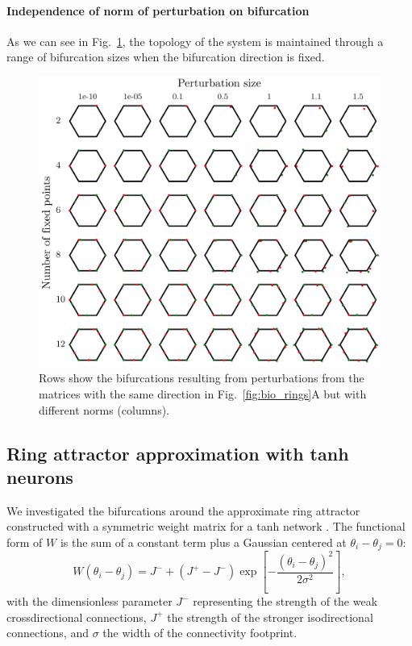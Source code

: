 \documentclass{article} %
\newcounter{ct}
\theoremstyle{definition}
\theoremstyle{remark}
\begin{document}
\paragraph{Independence of norm of perturbation on bifurcation}
As we can see in Fig.~\ref{fig:noorman_ring_allfxdpnts_allnorm}, the topology of the system is maintained through a range of bifurcation sizes when the bifurcation direction is fixed.
\begin{figure}[tbhp]
     \centering
    \includegraphics[width=\textwidth]{noorman_ring_N6_pert_allfxdpnts_allnorms}
       \caption{Rows show the bifurcations resulting from perturbations from the matrices with the same direction in Fig.~\ref{fig:bio_rings}A but with different norms (columns). }\label{fig:noorman_ring_allfxdpnts_allnorm}
\end{figure}






\newpage
\subsection{Ring attractor approximation with tanh neurons}\label{sec:supp:goodridge}


We investigated the bifurcations around the approximate ring attractor constructed with a symmetric weight matrix for a tanh network  \citep{compte2000synaptic, seeholzer2017efficient}.
The functional form of \(W\) is the sum of a constant term plus a Gaussian centered at \(\theta_i - \theta_j =0\):
\begin{equation}
W(\theta_i - \theta_j) = J^- + (J^+ - J^-) \exp\left[ -\frac{(\theta_i - \theta_j)^2}{2\sigma^2} \right],
\end{equation}
with the dimensionless parameter \(J^-\) representing the strength of the weak crossdirectional connections, \(J^+\) the strength of the stronger isodirectional connections,
 and \(\sigma\) the width of the connectivity footprint.
\end{document}
